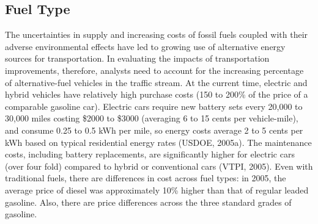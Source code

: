 \subsection{Fuel Type}
The uncertainties in supply and increasing costs of fossil fuels coupled with their adverse environmental effects have led to growing use of alternative energy sources for transportation. In evaluating the impacts of transportation improvements, therefore, analysts need to account for the increasing percentage of alternative-fuel vehicles in the traffic stream. At the current time, electric and hybrid vehicles have relatively high purchase costs (150 to 200\% of the price of a comparable gasoline car). Electric cars require new battery sets every 20,000 to 30,000 miles costing \$2000 to \$3000 (averaging 6 to 15 cents per vehicle-mile), and consume 0.25 to 0.5 kWh per mile, so energy costs average 2 to 5 cents per kWh based on typical residential energy rates (USDOE, 2005a). The maintenance costs, including battery replacements, are significantly higher for electric cars (over four fold) compared to hybrid or conventional cars (VTPI, 2005). Even with traditional fuels, there are differences in cost across fuel types: in 2005, the average price of diesel was approximately 10\% higher than that of regular leaded gasoline. Also, there are price differences across the three standard grades of gasoline.
